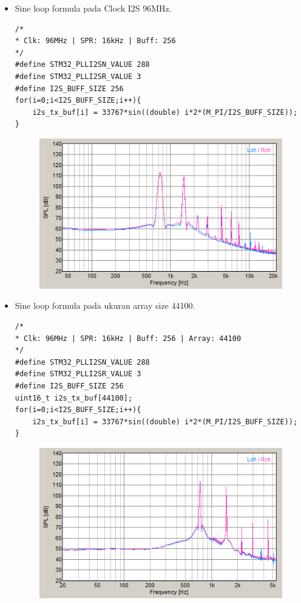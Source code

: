 \documentclass[12pt,]{article}
\begin{document}
\begin{itemize}
\begin{itemize}
			\newpage
			\item Sine loop formula pada Clock I2S 96MHz.
			\begin{verbatim}
/*
* Clk: 96MHz | SPR: 16kHz | Buff: 256
*/
#define STM32_PLLI2SN_VALUE 288
#define STM32_PLLI2SR_VALUE 3
#define I2S_BUFF_SIZE 256	
for(i=0;i<I2S_BUFF_SIZE;i++){
	i2s_tx_buf[i] = 33767*sin((double) i*2*(M_PI/I2S_BUFF_SIZE));
}
			\end{verbatim}
			\begin{figure}[H]
				\centering
				\includegraphics[width=0.5\linewidth]{result/day_2/sine_clk96}
			\end{figure}
		
			\item Sine loop formula pada ukuran array size 44100.
			\begin{verbatim}
/*
* Clk: 96MHz | SPR: 16kHz | Buff: 256 | Array: 44100
*/
#define STM32_PLLI2SN_VALUE 288
#define STM32_PLLI2SR_VALUE 3
#define I2S_BUFF_SIZE 256	
uint16_t i2s_tx_buf[44100];
for(i=0;i<I2S_BUFF_SIZE;i++){
	i2s_tx_buf[i] = 33767*sin((double) i*2*(M_PI/I2S_BUFF_SIZE));
}
			\end{verbatim}
			\begin{figure}[H]
				\centering
				\includegraphics[width=0.5\linewidth]{result/day_2/arr_spr_sine}
			\end{figure}
		

\end{itemize}
\end{itemize}
\end{document}
